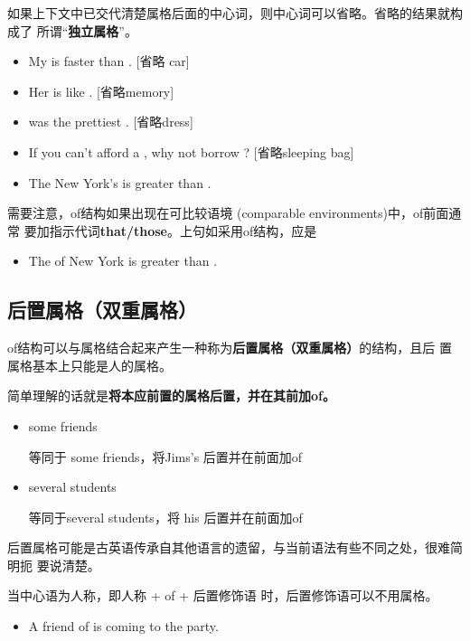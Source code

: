 如果上下文中已交代清楚属格后面的中心词，则中心词可以省略。省略的结果就构成了
所谓“\textbf{独立属格}”。
\begin{itemize}
\item  My  is faster than .  [省略 car]
\item  Her  is like . [省略memory]
\item {} was the prettiest . [省略dress]
\item If you can't afford a , why not borrow ? [省略sleeping bag]
\item The New York's  is greater than .
\end{itemize}

需要注意，of结构如果出现在可比较语境 (comparable environments)中，of前面通常
要加指示代词\textbf{that/those}。上句如采用of结构，应是
\begin{itemize}
\item The  of New York is greater than .
\end{itemize}

\subsection{后置属格（双重属格）}

of结构可以与属格结合起来产生一种称为\textbf{后置属格（双重属格）}的结构，且后
置属格基本上只能是人的属格。

简单理解的话就是\textbf{将本应前置的属格后置，并在其前加of。}

\begin{itemize}
\item some friends 

  等同于 some  friends，将Jims's 后置并在前面加of

\item several students 

  等同于several  students，将 his 后置并在前面加of
\end{itemize}

后置属格可能是古英语传承自其他语言的遗留，与当前语法有些不同之处，很难简明扼
要说清楚。

当中心语为人称，即人称 + of + 后置修饰语 时，后置修饰语可以不用属格。
\begin{itemize}
\item A friend of  is coming to the party.
\end{itemize}

